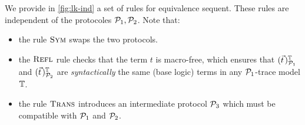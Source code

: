 

We provide in \cref{fig:lk-ind} a set of rules for equivalence sequent. These rules are independent of the protocoles $\mathcal{P}_1,\mathcal{P}_2$. Note that:
\begin{itemize}
\item the rule $\textsc{Sym}$ swaps the two protocols.
\item the $\textsc{Refl}$ rule checks that the term $t$ is macro-free, which ensures that $\interp{\pvec{t}}{\TM}{\calp_1}$ and $\interp{\pvec{t}}{\TM}{\calp_2}$ are \emph{syntactically} the same (base logic) terms in any $\mathcal{P}_1$-trace model $\mathbb{T}$.
\item the rule $\textsc{Trans}$ introduces an intermediate protocol $\mathcal{P}_3$ which must be compatible with $\mathcal{P}_1$ and $\mathcal{P}_2$.
\end{itemize}


